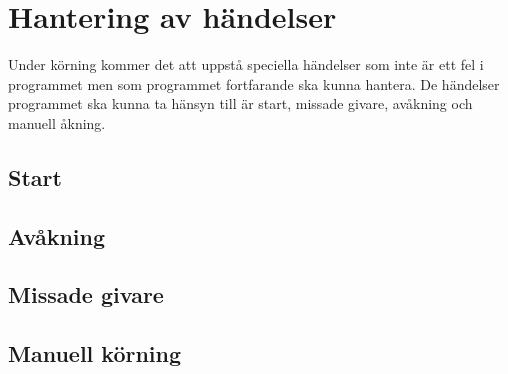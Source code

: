 \section{Hantering av händelser}
Under körning kommer det att uppstå speciella händelser som inte är ett fel i programmet men som programmet fortfarande ska kunna hantera. De händelser programmet ska kunna ta hänsyn till är start, missade givare, avåkning och manuell åkning.

\subsection{Start} 

\subsection{Avåkning} 

\subsection{Missade givare} 

\subsection{Manuell körning} 


